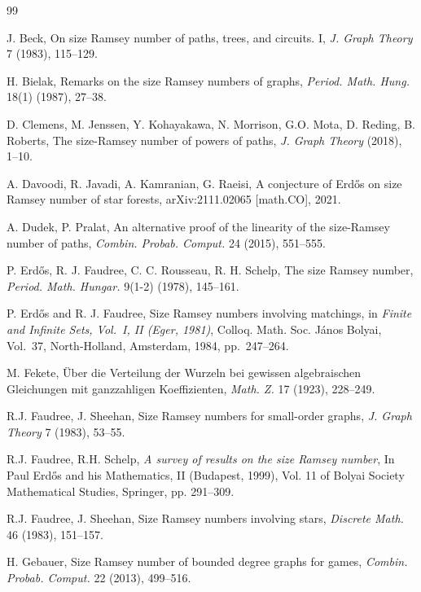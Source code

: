 \documentclass[11pt]{article}
\theoremstyle{definition}
\theoremstyle{remark}
\begin{document}
\begin{thebibliography}{99}

J. Beck, On size Ramsey number of paths, trees, and circuits. I,
\emph{J. Graph Theory} 7 (1983), 115--129.




H. Bielak, Remarks on the size Ramsey numbers of graphs,
\emph{Period. Math. Hung.} 18(1) (1987), 27--38.



D. Clemens, M. Jenssen, Y. Kohayakawa, N. Morrison, G.O. Mota, D. Reding, B. Roberts,
The size-Ramsey number of powers of paths,
\emph{J. Graph Theory} (2018), 1--10.


A. Davoodi, R. Javadi, A. Kamranian, G. Raeisi, A conjecture of Erd\H{o}s on size Ramsey number of star forests,
arXiv:2111.02065 [math.CO], 2021.


A. Dudek, P. Pralat, An alternative proof of the linearity of the size-Ramsey number of paths,
\emph{Combin. Probab. Comput.} 24 (2015), 551--555.




P. Erd\H{o}s, R. J. Faudree, C. C. Rousseau, R. H. Schelp,
The size Ramsey number,
\emph{Period. Math. Hungar.} 9(1-2) (1978), 145--161.

P. Erd\H{o}s and R. J. Faudree,
Size Ramsey numbers involving matchings,
in \emph{Finite and Infinite Sets, Vol.~I, II (Eger, 1981)},
Colloq. Math. Soc. J\'anos Bolyai, Vol.~37, North-Holland, Amsterdam, 1984,
pp.~247--264.



M. Fekete,
{\"U}ber die Verteilung der Wurzeln bei gewissen algebraischen Gleichungen mit ganzzahligen Koeffizienten,
\emph{Math. Z.} 17 (1923), 228--249.

R.J. Faudree, J. Sheehan, Size Ramsey numbers for small-order graphs,
\emph{J. Graph Theory} 7 (1983), 53--55.

R.J. Faudree, R.H. Schelp, \emph{A survey of results on the size Ramsey number},
In Paul Erd\H{o}s and his Mathematics, II (Budapest, 1999),
Vol. 11 of Bolyai Society Mathematical Studies, Springer, pp. 291--309.

R.J. Faudree, J. Sheehan, Size Ramsey numbers involving stars,
\emph{Discrete Math.} 46 (1983), 151--157.

H. Gebauer, Size Ramsey number of bounded degree graphs for games,
\emph{Combin. Probab. Comput.} 22 (2013), 499--516.




\end{thebibliography}
\end{document}
